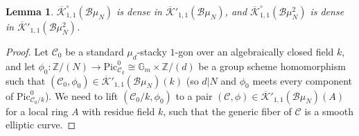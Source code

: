 \documentclass[11pt]{amsart}
\newtheorem{lemma}[subsection]{Lemma}
\theoremstyle{definition}
\begin{document}
\begin{lemma}\label{dense}
$\overline{\mathcal{K}}^\circ_{1,1}({\mathcal{B}}\mu_N)$ is dense in $\overline{\mathcal{K}}'_{1,1}({\mathcal{B}}\mu_N)$, and $\overline{\mathcal{K}}^\circ_{1,1}({\mathcal{B}}\mu_N^2)$ is dense in $\overline{\mathcal{K}}'_{1,1}({\mathcal{B}}\mu_N^2)$.
\end{lemma}
\begin{proof}
Let ${\mathcal{C}}_0$ be a standard $\mu_d$-stacky $1$-gon over an algebraically closed field $k$, and let $\phi_0: \mathbb{Z}/(N) \rightarrow \mathrm{Pic}^0_{{\mathcal{C}}_k} \cong \mathbb{G}_m \times \mathbb{Z}/(d)$ be a group scheme homomorphism such that $({\mathcal{C}}_0, \phi_0) \in \overline{\mathcal{K}}'_{1,1}({\mathcal{B}} \mu_N)(k)$ (so $d|N$ and $\phi_0$ meets every component of $\mathrm{Pic}^0_{{\mathcal{C}}_0/k}$). We need to lift $({\mathcal{C}}_0/k, \phi_0)$ to a pair $({\mathcal{C}}, \phi) \in \overline{\mathcal{K}}'_{1,1}({\mathcal{B}} \mu_N)(A)$ for a local ring $A$ with residue field $k$, such that the generic fiber of ${\mathcal{C}}$ is a smooth elliptic curve.


\end{proof}
\end{document}
